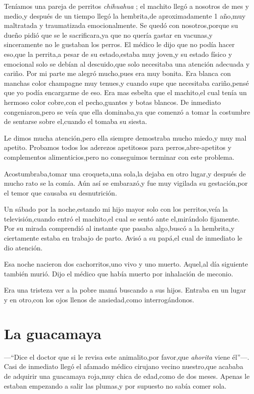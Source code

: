 \documentclass[letterpaper,12pt]{book}
\begin{document}
Teníamos una pareja de perritos {\it chihuahua}\/ ; el machito llegó a nosotros de mes y medio,y después de un tiempo llegó la hembrita,de aproximadamente 1 año,muy maltratada y traumatizada emocionalmente. Se quedó con nosotros,porque su dueño pidió que se le sacrificara,ya que no quería gastar en vacunas,y sinceramente no le gustaban los perros. El médico le dijo que no podía hacer eso,que la perrita,a pesar de su estado,estaba muy joven,y su estado físico y emocional solo se debían al descuido,que solo necesitaba una atención adecuada y cariño. Por mi parte me alegró mucho,pues era muy bonita. Era blanca con manchas color champagne muy tenues,y cuando supe que necesitaba cariño,pensé que yo podía encargarme de eso. Era mas esbelta que el machito,el cual tenía un hermoso color cobre,con el pecho,guantes y botas blancos. De inmediato congeniaron,pero se veía que ella dominaba,ya que comenzó a tomar la costumbre de sentarse sobre el,cuando el tomaba su siesta. 

Le dimos mucha atención,pero ella siempre demostraba mucho miedo,y muy mal apetito. Probamos todos los aderezos apetitosos para perros,abre-apetitos y complementos alimenticios,pero no conseguimos terminar con este problema. 

Acostumbraba,tomar una croqueta,una sola,la dejaba en otro lugar,y después de mucho rato se la comía. Aún así se embarazó,y fue muy vigilada su gestación,por el temor que causaba su desnutrición.

Un sábado por la noche,estando mi hijo mayor solo con los perritos,veía la televisión,cuando entró el machito,el cual se sentó ante el,mirándolo fijamente. Por su mirada comprendió al instante que pasaba algo,buscó a la hembrita,y ciertamente estaba en trabajo de parto. Avisó a su papá,el cual de inmediato le dio atención. 

Esa noche nacieron dos cachorritos,uno vivo y uno muerto. Aquel,al día siguiente también murió. Dijo el médico que había muerto por inhalación de meconio. 

Era una tristeza ver a la pobre mamá buscando a sus hijos. Entraba en un lugar y en otro,con los ojos llenos de ansiedad,como interrogándonos.

\chapter{La guacamaya}

---``Dice el doctor que si le revisa este animalito,por favor,que {\it ahorita}\/ viene él''---. Casi de inmediato llegó el afamado médico cirujano vecino nuestro,que acababa de adquirir una guacamaya roja,muy chica de edad,como de dos meses. Apenas le estaban empezando a salir las plumas,y por supuesto no sabía comer sola. 
\end{document}
